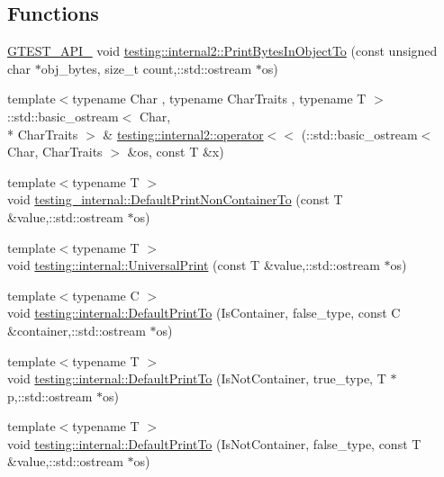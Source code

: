 \subsection*{Functions}
\begin{DoxyCompactItemize}
\item 
\hyperlink{gtest-port_8h_aa73be6f0ba4a7456180a94904ce17790}{G\-T\-E\-S\-T\-\_\-\-A\-P\-I\-\_\-} void \hyperlink{namespacetesting_1_1internal2_a04a384ee5de3a9f4f00a6052ea79b495}{testing\-::internal2\-::\-Print\-Bytes\-In\-Object\-To} (const unsigned char $\ast$obj\-\_\-bytes, size\-\_\-t count,\-::std\-::ostream $\ast$os)
\item 
{\footnotesize template$<$typename Char , typename Char\-Traits , typename T $>$ }\\\-::std\-::basic\-\_\-ostream$<$ Char, \\*
Char\-Traits $>$ \& \hyperlink{namespacetesting_1_1internal2_a07dbe129beb8952074f04b599dfce39b}{testing\-::internal2\-::operator$<$$<$} (\-::std\-::basic\-\_\-ostream$<$ Char, Char\-Traits $>$ \&os, const T \&x)
\item 
{\footnotesize template$<$typename T $>$ }\\void \hyperlink{namespacetesting__internal_ad4e5852805f397248a0867c0c4265ea5}{testing\-\_\-internal\-::\-Default\-Print\-Non\-Container\-To} (const T \&value,\-::std\-::ostream $\ast$os)
\item 
{\footnotesize template$<$typename T $>$ }\\void \hyperlink{namespacetesting_1_1internal_ad121a890bddf866e59605d1a0198dada}{testing\-::internal\-::\-Universal\-Print} (const T \&value,\-::std\-::ostream $\ast$os)
\item 
{\footnotesize template$<$typename C $>$ }\\void \hyperlink{namespacetesting_1_1internal_a729016f07085b1cfb44d21331f791141}{testing\-::internal\-::\-Default\-Print\-To} (Is\-Container, false\-\_\-type, const C \&container,\-::std\-::ostream $\ast$os)
\item 
{\footnotesize template$<$typename T $>$ }\\void \hyperlink{namespacetesting_1_1internal_aa8dafaf55c18333baa5fdb858e69be96}{testing\-::internal\-::\-Default\-Print\-To} (Is\-Not\-Container, true\-\_\-type, T $\ast$p,\-::std\-::ostream $\ast$os)
\item 
{\footnotesize template$<$typename T $>$ }\\void \hyperlink{namespacetesting_1_1internal_a29e705ab252af57e825a086bb49c4831}{testing\-::internal\-::\-Default\-Print\-To} (Is\-Not\-Container, false\-\_\-type, const T \&value,\-::std\-::ostream $\ast$os)

\end{DoxyCompactItemize}
